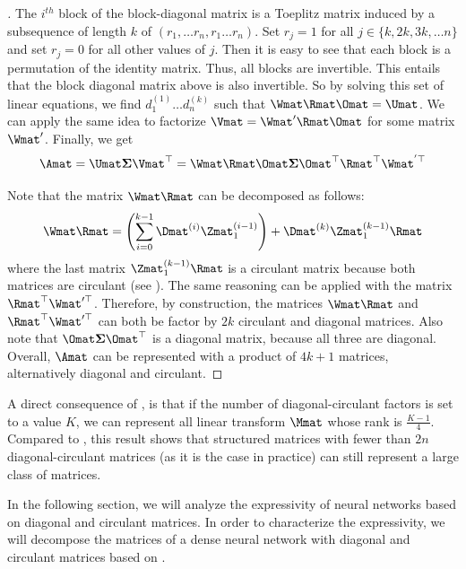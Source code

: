 \begin{proof}[]
\noindent
The $i^{th}$ block of the block-diagonal matrix is a Toeplitz matrix induced by a subsequence of length $k$ of $(r_1,\ldots r_n,r_1 \ldots r_n)$.
Set $r_{j}=1$ for all $j\in\{k,2k,3k,\ldots n\}$ and set $r_{j}=0$ for all other values of $j$.
Then it is easy to see that each block is a permutation of the identity matrix.
Thus, all blocks are invertible.
This entails that the block diagonal matrix above is also invertible.
So by solving this set of linear equations, we find $d_{1}^{(1)} \ldots d_{n}^{(k)}$ such that $\Wmat\Rmat\Omat=\Umat$.
We can apply the same idea to factorize $\Vmat = \Wmat' \Rmat \Omat$ for some matrix $\Wmat'$.
Finally, we get 
\begin{equation}
  \Amat = \Umat \mathbf{\Sigma} \Vmat^\top = \Wmat\Rmat\Omat \mathbf{\Sigma} \Omat^\top \Rmat^\top \Wmat^{'\top}
\end{equation}

\noindent
Note that the matrix $\Wmat\Rmat$ can be decomposed as follows:
\begin{equation}
  \Wmat\Rmat = \left( \sum_{i=0}^{k-1} \Dmat^{(i)} \Zmat_1^{(i-1)} \right) + \Dmat^{(k)} \Zmat_1^{(k-1)} \Rmat
\end{equation}
where the last matrix $\Zmat_1^{(k-1)} \Rmat$ is a circulant matrix because both matrices are circulant (see ).
The same reasoning can be applied with the matrix $\Rmat^\top\Wmat'^\top$.
Therefore, by construction, the matrices $\Wmat\Rmat$ and $\Rmat^\top\Wmat'^\top$ can both be factor by $2k$ circulant and diagonal matrices.
Also note that $\Omat \mathbf{\Sigma} \Omat^\top$ is a diagonal matrix, because all three are diagonal.
Overall, $\Amat$ can be represented with a product of $4k+1$ matrices, alternatively diagonal and circulant.
\end{proof}

A direct consequence of , is that if the number of diagonal-circulant factors is set to a value $K$, we can represent all linear transform $\Mmat$ whose rank is $\frac{K - 1}{4}$.
Compared to \citet{huhtanen2015factoring}, this result shows that structured matrices with fewer than $2n$ diagonal-circulant matrices (as it is the case in practice) can still represent a large class of matrices.

In the following section, we will analyze the expressivity of neural networks based on diagonal and circulant matrices.
In order to characterize the expressivity, we will decompose the matrices of a dense neural network with diagonal and circulant matrices based on .

